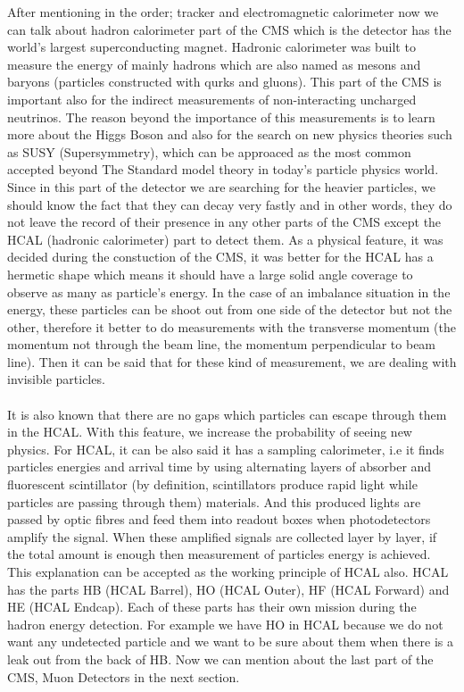 \documentclass[a4paper,10pt]{article}
\begin{document}
After mentioning in the order; tracker 
and electromagnetic calorimeter now we can talk about hadron calorimeter
part of the CMS which is the detector has the world's largest superconducting magnet. Hadronic calorimeter was built to measure the energy of mainly hadrons
which are also named as mesons and baryons (particles constructed with qurks and gluons). This part of the CMS is important also for the indirect measurements
of non-interacting uncharged neutrinos. The reason beyond the importance of this measurements is to learn more about the Higgs Boson and also for the search
on new physics theories such as SUSY (Supersymmetry), which can be approaced as the most common accepted beyond The Standard model theory in today's particle
physics world. Since in this part of the detector we are searching for the heavier particles, we should know the fact that they can decay very fastly and in
other words, they do not leave the record of their presence in any other parts of the CMS except the HCAL (hadronic calorimeter) part to detect them.
As a physical feature, it was decided during the constuction of the CMS, it was better for the HCAL has a hermetic shape which means it should have a large solid
angle coverage to observe as many as particle's energy. In the case of an imbalance situation in the energy, these particles can be shoot out from one side of
the detector but not the other, therefore it better to do measurements with the transverse momentum (the momentum not through the beam line, the momentum perpendicular to
beam line). Then it can be said that for these kind of measurement, we are dealing with invisible particles.
\\\\
It is also known that there are no gaps which particles can escape through them in the HCAL. With this feature, we increase the probability of seeing new physics.
For HCAL, it can be also said it has a sampling calorimeter, i.e it finds particles energies and arrival time by using alternating layers of absorber and
fluorescent scintillator (by definition, scintillators produce rapid light while particles are passing through them) materials. 
And this produced lights are passed by optic fibres and feed them into readout boxes when photodetectors amplify the signal. When these amplified signals are
collected layer by layer, if the total amount is enough then measurement of particles energy is achieved. This explanation can be accepted as the working 
principle of HCAL also. HCAL has the parts HB (HCAL Barrel), HO (HCAL Outer), HF (HCAL Forward) and HE (HCAL Endcap). Each of these parts has their own
mission during the hadron energy detection. For example we have HO in HCAL because we do not want any undetected particle and we want to be sure about them
when there is a leak out  from the back of HB. Now we can mention about the last part of the CMS, Muon Detectors in the next section.
\end{document}
